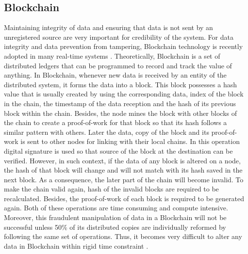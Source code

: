 \documentclass[final,5p,times,twocolumn]{elsarticle}
\begin{document}
\subsection{Blockchain}
Maintaining integrity of data and ensuring that data is not sent by an unregistered source are very important for credibility of the system. For data integrity and data prevention from tampering, Blockchain technology is recently adopted in many real-time systems \cite{blockchain}. Theoretically, Blockchain is a set of distributed ledgers that can be programmed to record and track the value of anything. In Blockchain, whenever new data is received by an entity of the distributed system, it forms the data into a block. This block possesses a hash value that is usually created by using the corresponding data, index of the block in the chain, the timestamp of the data reception and the hash of its previous block within the chain. Besides, the node mines the block with other blocks of the chain to create a proof-of-work for that block so that its hash follows a similar pattern with others. Later the data, copy of the block and its proof-of-work is sent to other nodes for linking with their local chains. In this operation digital signature is used so that source of the block at the destination can be verified. However, in such context, if the data of any block is altered on a node, the hash of that block will change and will not match with its hash saved in the next block. As a consequence, the later part of the chain will become invalid. To make the chain valid again, hash of the invalid blocks are required to be recalculated. Besides, the proof-of-work of each block is required to be generated again. Both of these operations are time consuming and compute intensive. Moreover, this fraudulent manipulation of data in a Blockchain will not be successful unless 50\% of its distributed copies are individually reformed by following the same set of operations. Thus, it becomes very difficult to alter any data in Blockchain within rigid time constraint \cite{blockchainbook}. 
%
\end{document}
